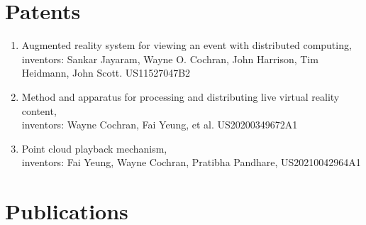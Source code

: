 \documentclass[10pt]{article}
\begin{document}
\section*{Patents}

\begin{enumerate}
\item Augmented reality system for viewing an event with distributed computing,
   inventors: Sankar Jayaram, Wayne O. Cochran, John  Harrison, Tim Heidmann, John Scott.
   US11527047B2
\item Method and apparatus for processing and distributing live virtual reality content,\\
   inventors: Wayne Cochran, Fai Yeung, et al.
   US20200349672A1
\item Point cloud playback mechanism,\\
   inventors: Fai Yeung, Wayne Cochran, Pratibha Pandhare,
   US20210042964A1
\end{enumerate}

\section*{Publications}
\end{document}

